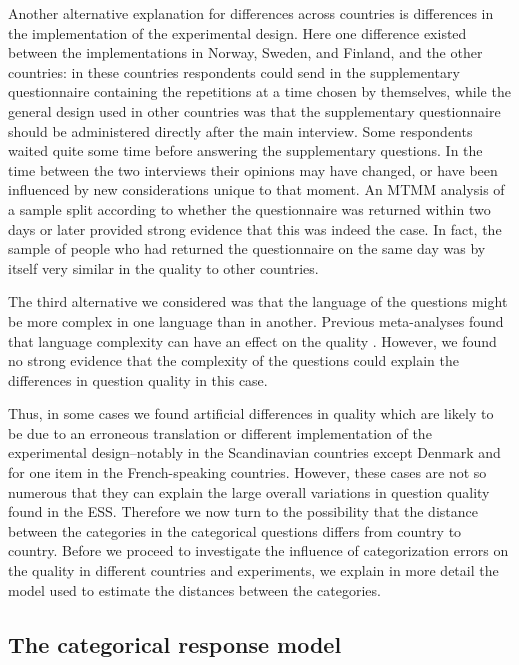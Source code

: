 \documentclass[a4paper,12pt]{article}
\begin{document}
Another alternative explanation for differences across countries is differences in the implementation of the experimental design. Here one difference existed between the implementations in Norway, Sweden, and Finland, and the other countries: in these countries respondents could send in the supplementary questionnaire containing the repetitions at a time chosen by themselves, while the general design used in other countries was that the supplementary questionnaire should be administered directly after the main interview. Some respondents waited quite some time before answering the supplementary questions. In the time between the two interviews their opinions may have changed, or have been influenced by new considerations unique to that moment. An MTMM analysis of a sample split according to whether the questionnaire was returned within two days or later provided strong evidence that this was indeed the case. In fact, the sample of people who had returned the questionnaire on the same day was by itself very similar in the quality to other countries. 

The third alternative we considered was that the language of the questions might be more complex in one language than in another. Previous meta-analyses found that language complexity can have an effect on the quality \citep{saris_estimation_2007}. However, we found no strong evidence that the complexity of the questions could explain the differences in question quality in this case.

Thus, in some cases we found artificial differences in quality which are likely to be due to an erroneous translation or different implementation of the experimental design--notably in the Scandinavian countries except Denmark and for one item in the French-speaking countries. However, these cases are not so numerous that they can explain the large overall variations in question quality found in the ESS. Therefore we now turn to the possibility that the distance between the categories in the categorical questions differs from country to country. Before we proceed to investigate the influence of categorization errors on the quality in different countries and experiments, we explain in more detail the model used to estimate the distances between the categories.


\subsection{The categorical response model}
\end{document}
